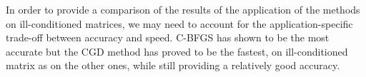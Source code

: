 \documentclass{article}
\numberwithin{equation}{section}
\begin{document}
In order to provide a comparison of the results of the application of the methods on ill-conditioned matrices, we may need to account for the application-specific trade-off between accuracy and speed. C-BFGS has shown to be the most accurate but the CGD method has proved to be the fastest, on ill-conditioned matrix as on the other ones, while still providing a relatively good accuracy.

\newpage
\medskip

\printbibliography
\end{document}
